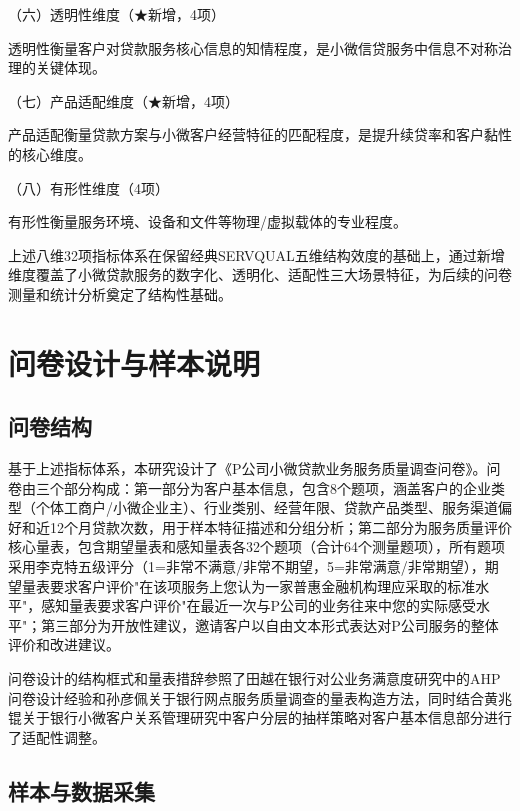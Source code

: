 （六）透明性维度（★新增，4项）

透明性衡量客户对贷款服务核心信息的知情程度，是小微信贷服务中信息不对称治理的关键体现。\par


（七）产品适配维度（★新增，4项）

产品适配衡量贷款方案与小微客户经营特征的匹配程度，是提升续贷率和客户黏性的核心维度。\par


（八）有形性维度（4项）

有形性衡量服务环境、设备和文件等物理/虚拟载体的专业程度。\par


上述八维32项指标体系在保留经典SERVQUAL五维结构效度的基础上，通过新增维度覆盖了小微贷款服务的数字化、透明化、适配性三大场景特征，为后续的问卷测量和统计分析奠定了结构性基础。\par

\section{问卷设计与样本说明}

\subsection{问卷结构}

基于上述指标体系，本研究设计了《P公司小微贷款业务服务质量调查问卷》。问卷由三个部分构成：第一部分为客户基本信息，包含8个题项，涵盖客户的企业类型（个体工商户/小微企业主）、行业类别、经营年限、贷款产品类型、服务渠道偏好和近12个月贷款次数，用于样本特征描述和分组分析；第二部分为服务质量评价核心量表，包含期望量表和感知量表各32个题项（合计64个测量题项），所有题项采用李克特五级评分（1=非常不满意/非常不期望，5=非常满意/非常期望），期望量表要求客户评价"在该项服务上您认为一家普惠金融机构理应采取的标准水平"，感知量表要求客户评价"在最近一次与P公司的业务往来中您的实际感受水平"；第三部分为开放性建议，邀请客户以自由文本形式表达对P公司服务的整体评价和改进建议。\par

问卷设计的结构框式和量表措辞参照了田越在银行对公业务满意度研究中的AHP问卷设计经验\cite{ref44}和孙彦佩关于银行网点服务质量调查的量表构造方法\cite{ref37}，同时结合黄兆锟关于银行小微客户关系管理研究中客户分层的抽样策略\cite{ref38}对客户基本信息部分进行了适配性调整。\par

\subsection{样本与数据采集}

